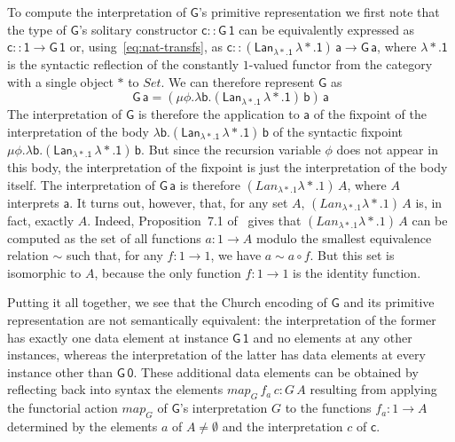 \documentclass[acmsmall,screen,review,anonymous]{acmart}
\theoremstyle{definition}
\newcommand{\set}{\mathsf{Set}}
\begin{document}
\begin{example}
To compute the interpretation of $\mathsf{G}$'s primitive
representation we first note that the type of $\mathsf{G}$'s solitary
constructor $\mathsf{c :: G\,1}$ can be equivalently expressed as
$\mathsf{c :: 1 \to G\,1}$ or, using~\eqref{eq:nat-transfs}, as
$\mathsf{c :: (Lan_{\lambda *. 1}\,\lambda *. 1)\,a \to G\, a}$, where
$\mathsf{\lambda *. 1}$ is the syntactic reflection of the constantly
$1$-valued functor from the category with a single object $*$ to
$\mathit{Set}$. We can therefore represent $\mathsf{G}$ as
\[\mathsf{G\,a} = \mathsf{(\mu \phi. \lambda b.
 (Lan_{\lambda *. 1} \,\lambda *.  1)\,b)\,a}\] The interpretation of
$\mathsf{G}$ is therefore the application to $\mathsf{a}$ of the
fixpoint of the interpretation of the body $\mathsf{\lambda
  b. (Lan_{\lambda *. 1} \,\lambda *. 1)\,b}$ of the syntactic
fixpoint $\mathsf{\mu \phi. \lambda b.  (Lan_{\lambda *. 1} \,\lambda
  *.  1)\,b}$. But since the recursion variable $\mathsf{\phi}$ does
not appear in this body, the interpretation of the fixpoint is just
the interpretation of the body itself.  The interpretation of
$\mathsf{G\,a}$ is therefore $(\mathit{Lan}_{\lambda *. 1} \lambda
*. 1)\, A$, where $A$ interprets $\mathsf{a}$.
It turns out, however, that, for any set $A$, $(\mathit{Lan}_{\lambda
  *. 1} \lambda *. 1)\,A$ is, in fact, exactly $A$. Indeed,
Proposition~7.1 of~\cite{blw03} gives that $(\mathit{Lan}_{\lambda
  *. 1} \lambda *. 1)\,A$ can be computed as the set of all functions
$a : 1 \to A$ modulo the smallest equivalence relation $\sim$ such
that, for any $f : 1 \to 1$, we have $a \sim a \circ f$.  But this set
is isomorphic to $A$, because the only function $f : 1 \to 1$ is the
identity function.


Putting it all together, we see that the Church encoding of
$\mathsf{G}$ and its primitive representation are not semantically
equivalent: the interpretation of the former has exactly one data
element at instance $\mathsf{G\,1}$ and no elements at any other
instances, whereas the interpretation of the latter has data elements
at every instance other than $\mathsf{G\,0}$.
These additional data elements can be obtained by reflecting back into
syntax the elements $\mathit{map}_G\,f_a\,c : G\,A$ resulting from
applying the functorial action $\mathit{map}_G$ of $\mathsf{G}$'s
interpretation $G$ to the functions $f_a : 1 \to A$ determined by the
elements $a$ of $A \not = \emptyset$ and the interpretation $c$ of
$\mathsf{c}$.
\end{example}
\end{document}
